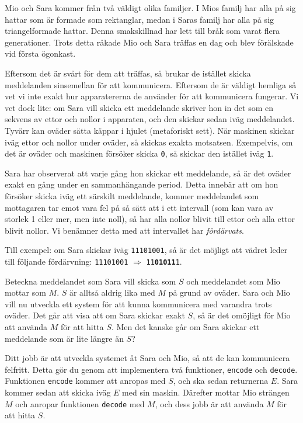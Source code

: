 \noindent

Mio och Sara kommer från två väldigt olika familjer. I Mios familj har alla på sig hattar som
är formade som rektanglar, medan i Saras familj har alla på sig triangelformade hattar. Denna
smakskillnad har lett till bråk som varat flera generationer. Trots detta råkade Mio och Sara
träffas en dag och blev förälskade vid första ögonkast.

Eftersom det är svårt för dem att träffas, så brukar de istället skicka meddelanden sinsemellan
för att kommunicera. Eftersom de är väldigt hemliga så vet vi inte exakt hur apparatererna de
använder för att kommunicera fungerar.  Vi vet dock lite: om Sara vill skicka ett meddelande
skriver hon in det som en sekvens av ettor och nollor i apparaten, och den skickar sedan
iväg meddelandet. Tyvärr kan oväder sätta käppar i hjulet (metaforiskt sett).
När maskinen skickar iväg ettor och nollor under oväder, så skickas exakta motsatsen.
Exempelvis, om det är oväder och maskinen försöker skicka \texttt{0},
så skickar den istället iväg \texttt{1}.

Sara har observerat att varje gång hon skickar ett meddelande, så är det oväder
exakt en gång under en sammanhängande period. Detta innebär att om hon försöker skicka
iväg ett särskilt meddelande, kommer meddelandet som mottagaren tar emot vara fel på
så sätt att i ett intervall (som kan vara av storlek 1 eller mer, men inte noll), så har alla
nollor blivit till ettor och alla ettor blivit nollor. Vi benämner detta med att
intervallet har \textit{fördärvats}.

Till exempel: om Sara skickar iväg \texttt{11101001}, så är det möjligt att vädret
leder till följande fördärvning: \texttt{11101001} $\Rightarrow$ \texttt{11\textbf{01011}1}.

Beteckna meddelandet som Sara vill skicka som $S$ och meddelandet som Mio mottar som $M$.
$S$ är alltså aldrig lika med $M$ på grund av oväder. Sara och Mio vill nu utveckla
ett system för att kunna kommunicera med varandra trots oväder. Det går att visa att om
Sara skickar exakt $S$, så är det omöjligt för Mio att använda $M$ för att hitta $S$. Men det kanske
går om Sara skickar ett meddelande som är lite längre än $S$? 

Ditt jobb är att utveckla systemet åt Sara och Mio, så att de kan kommunicera felfritt.
Detta gör du genom att implementera två funktioner, \texttt{encode} och \texttt{decode}.
Funktionen \texttt{encode} kommer att anropas med $S$, och ska sedan returnerna $E$. Sara kommer
sedan att skicka iväg $E$ med sin maskin.
Därefter mottar Mio strängen $M$ och anropar funktionen \texttt{decode} med $M$, och dess jobb är
att använda $M$ för att hitta $S$.

